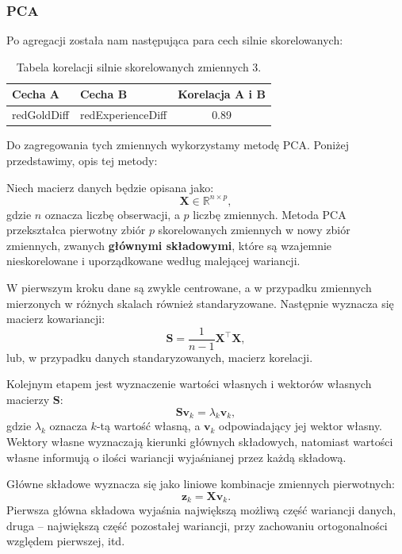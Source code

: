 \documentclass[twoside]{customStyle}
\begin{document}
\begin{samepage}
\subsubsection{PCA}
\indent \indent Po agregacji została nam następująca para cech silnie skorelowanych:
\begin{table}[H]
  \centering
\begin{tabular}{l l c}
	\toprule
	\textbf{Cecha A} & \textbf{Cecha B} &  \textbf{Korelacja A i B}  \\
	\midrule
	redGoldDiff & redExperienceDiff & 0.89 \\ 
	\bottomrule
\end{tabular}
\caption{Tabela korelacji silnie skorelowanych zmiennych 3.}
\end{table}
\indent \indent Do zagregowania tych zmiennych wykorzystamy metodę PCA. Poniżej przedstawimy, opis tej metody:
\newline 

Niech macierz danych będzie opisana jako:
\begin{equation}
\mathbf{X} \in \mathbb{R}^{n \times p},
\end{equation}
gdzie $n$ oznacza liczbę obserwacji, a $p$ liczbę zmiennych. Metoda PCA przekształca pierwotny zbiór $p$ skorelowanych zmiennych w nowy zbiór zmiennych, zwanych \textbf{głównymi składowymi}, które są wzajemnie nieskorelowane i uporządkowane według malejącej wariancji.

W pierwszym kroku dane są zwykle centrowane, a w przypadku zmiennych mierzonych w różnych skalach również standaryzowane. Następnie wyznacza się macierz kowariancji:
\begin{equation}
\mathbf{S} = \frac{1}{n-1}\mathbf{X}^\top \mathbf{X},
\end{equation}
lub, w przypadku danych standaryzowanych, macierz korelacji.

Kolejnym etapem jest wyznaczenie wartości własnych i wektorów własnych macierzy $\mathbf{S}$:
\begin{equation}
\mathbf{S}\mathbf{v}_k = \lambda_k \mathbf{v}_k,
\end{equation}
gdzie $\lambda_k$ oznacza $k$-tą wartość własną, a $\mathbf{v}_k$ odpowiadający jej wektor własny. Wektory własne wyznaczają kierunki głównych składowych, natomiast wartości własne informują o ilości wariancji wyjaśnianej przez każdą składową.

Główne składowe wyznacza się jako liniowe kombinacje zmiennych pierwotnych:
\begin{equation}
\mathbf{z}_k = \mathbf{X}\mathbf{v}_k.
\end{equation}
Pierwsza główna składowa wyjaśnia największą możliwą część wariancji danych, druga -- największą część pozostałej wariancji, przy zachowaniu ortogonalności względem pierwszej, itd.


\end{samepage}
\end{document}
